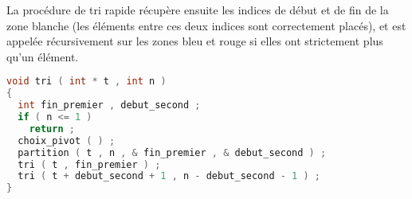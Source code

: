 \question La procédure de tri rapide récupère ensuite les indices de
début et de fin de la zone blanche (les éléments entre ces deux
indices sont correctement placés), et est appelée récursivement sur
les zones bleu et rouge si elles ont strictement plus qu'un élément.
\begin{solution}
  \begin{lstlisting}[language=C]
void tri ( int * t , int n )
{
  int fin_premier , debut_second ;
  if ( n <= 1 )
    return ;
  choix_pivot ( ) ;
  partition ( t , n , & fin_premier , & debut_second ) ;
  tri ( t , fin_premier ) ;
  tri ( t + debut_second + 1 , n - debut_second - 1 ) ;
}  
  \end{lstlisting}
\end{solution}



